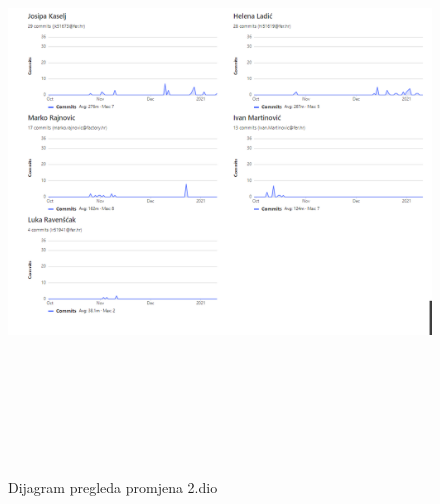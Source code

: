 	\begin{figure}[H]
		\includegraphics[width=170mm,height=160mm]{slike/aktivnost_2.png} %
		\centering
		\caption{Dijagram pregleda promjena 2.dio}
		\label{fig:dijagrami_pregleda_promjena}
	\end{figure}
		
	